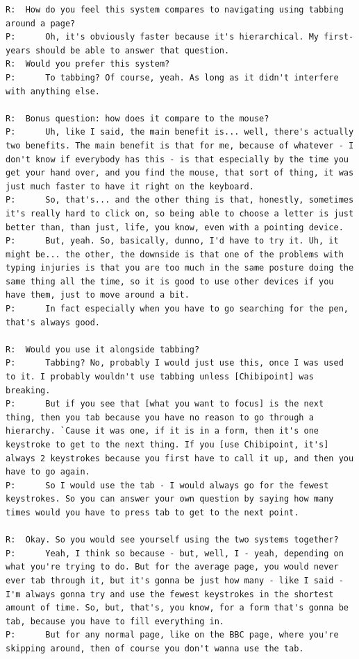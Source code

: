 \documentclass[11pt,openright,a4paper]{report}
\begin{document}
\begin{lstlisting}[caption={Transcript of Usability Study}, label={lst:usabilityTrans}, style=basic, language=custom, flexiblecolumns=true]
R:	How do you feel this system compares to navigating using tabbing around a page?
P:		Oh, it's obviously faster because it's hierarchical. My first-years should be able to answer that question.
R:	Would you prefer this system?
P:		To tabbing? Of course, yeah. As long as it didn't interfere with anything else.

R:	Bonus question: how does it compare to the mouse?
P:		Uh, like I said, the main benefit is... well, there's actually two benefits. The main benefit is that for me, because of whatever - I don't know if everybody has this - is that especially by the time you get your hand over, and you find the mouse, that sort of thing, it was just much faster to have it right on the keyboard.
P:		So, that's... and the other thing is that, honestly, sometimes it's really hard to click on, so being able to choose a letter is just better than, than just, life, you know, even with a pointing device.
P:		But, yeah. So, basically, dunno, I'd have to try it. Uh, it might be... the other, the downside is that one of the problems with typing injuries is that you are too much in the same posture doing the same thing all the time, so it is good to use other devices if you have them, just to move around a bit.
P:		In fact especially when you have to go searching for the pen, that's always good.

R:	Would you use it alongside tabbing?
P:		Tabbing? No, probably I would just use this, once I was used to it. I probably wouldn't use tabbing unless [Chibipoint] was breaking.
P:		But if you see that [what you want to focus] is the next thing, then you tab because you have no reason to go through a hierarchy. `Cause it was one, if it is in a form, then it's one keystroke to get to the next thing. If you [use Chibipoint, it's] always 2 keystrokes because you first have to call it up, and then you have to go again.
P:		So I would use the tab - I would always go for the fewest keystrokes. So you can answer your own question by saying how many times would you have to press tab to get to the next point.

R:	Okay. So you would see yourself using the two systems together?
P:		Yeah, I think so because - but, well, I - yeah, depending on what you're trying to do. But for the average page, you would never ever tab through it, but it's gonna be just how many - like I said - I'm always gonna try and use the fewest keystrokes in the shortest amount of time. So, but, that's, you know, for a form that's gonna be tab, because you have to fill everything in.
P:		But for any normal page, like on the BBC page, where you're skipping around, then of course you don't wanna use the tab.


\end{lstlisting}
\end{document}
